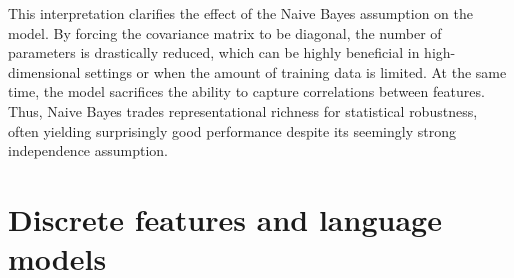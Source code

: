 This interpretation clarifies the effect of the Naive Bayes assumption on the model. By forcing the covariance matrix to be diagonal, the number of parameters is drastically reduced, which can be highly beneficial in high-dimensional settings or when the amount of training data is limited. At the same time, the model sacrifices the ability to capture correlations between features. Thus, Naive Bayes trades representational richness for statistical robustness, often yielding surprisingly good performance despite its seemingly strong independence assumption.

\section*{Discrete features and language models}
%
%

